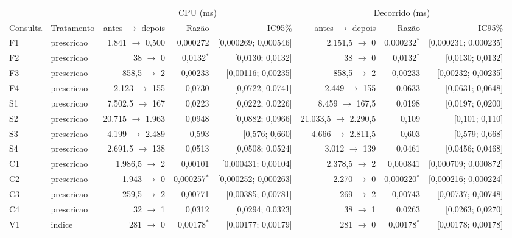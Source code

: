 {\footnotesize\setlength{\tabcolsep}{4pt}
\begin{tabular}{llrrrrrr}
\toprule
 &  & \multicolumn{3}{c}{CPU (ms)} & \multicolumn{3}{c}{Decorrido (ms)} \\
\cmidrule(lr){3-5}\cmidrule(lr){6-8}
Consulta & Tratamento & antes $\to$ depois & Razão & IC95\% & antes $\to$ depois & Razão & IC95\% \\
\midrule
F1 & prescricao & 1.841 $\to$ 0,500 & 0,000272 & [0,000269; 0,000546] & 2.151,5 $\to$ 0 & 0,000232$^{*}$ & [0,000231; 0,000235] \\
F2 & prescricao & 38 $\to$ 0 & 0,0132$^{*}$ & [0,0130; 0,0132] & 38 $\to$ 0 & 0,0132$^{*}$ & [0,0130; 0,0132] \\
F3 & prescricao & 858,5 $\to$ 2 & 0,00233 & [0,00116; 0,00235] & 858,5 $\to$ 2 & 0,00233 & [0,00232; 0,00235] \\
F4 & prescricao & 2.123 $\to$ 155 & 0,0730 & [0,0722; 0,0741] & 2.449 $\to$ 155 & 0,0633 & [0,0631; 0,0648] \\
S1 & prescricao & 7.502,5 $\to$ 167 & 0,0223 & [0,0222; 0,0226] & 8.459 $\to$ 167,5 & 0,0198 & [0,0197; 0,0200] \\
S2 & prescricao & 20.715 $\to$ 1.963 & 0,0948 & [0,0882; 0,0966] & 21.033,5 $\to$ 2.290,5 & 0,109 & [0,101; 0,110] \\
S3 & prescricao & 4.199 $\to$ 2.489 & 0,593 & [0,576; 0,660] & 4.666 $\to$ 2.811,5 & 0,603 & [0,579; 0,668] \\
S4 & prescricao & 2.691,5 $\to$ 138 & 0,0513 & [0,0508; 0,0524] & 3.012 $\to$ 139 & 0,0461 & [0,0456; 0,0468] \\
C1 & prescricao & 1.986,5 $\to$ 2 & 0,00101 & [0,000431; 0,00104] & 2.378,5 $\to$ 2 & 0,000841 & [0,000709; 0,000872] \\
C2 & prescricao & 1.943 $\to$ 0 & 0,000257$^{*}$ & [0,000252; 0,000263] & 2.270 $\to$ 0 & 0,000220$^{*}$ & [0,000216; 0,000224] \\
C3 & prescricao & 259,5 $\to$ 2 & 0,00771 & [0,00385; 0,00781] & 269 $\to$ 2 & 0,00743 & [0,00737; 0,00748] \\
C4 & prescricao & 32 $\to$ 1 & 0,0312 & [0,0294; 0,0323] & 38 $\to$ 1 & 0,0263 & [0,0263; 0,0270] \\
V1 & indice & 281 $\to$ 0 & 0,00178$^{*}$ & [0,00177; 0,00179] & 281 $\to$ 0 & 0,00178$^{*}$ & [0,00178; 0,00178] \\

\end{tabular}}
